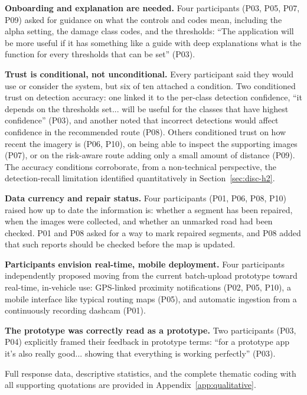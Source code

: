 \documentclass[10pt,a4paper,twocolumn]{article}
\begin{document}
\textbf{Onboarding and explanation are needed.} Four participants (P03,
P05, P07, P09) asked for guidance on what the controls and codes mean,
including the alpha setting, the damage class codes, and the thresholds:
``The application will be more useful if it has something like a guide
with deep explanations what is the function for every thresholds that can
be set'' (P03).

\textbf{Trust is conditional, not unconditional.} Every participant said
they would use or consider the system, but six of ten attached a
condition. Two conditioned trust on detection accuracy: one linked it to
the per-class detection confidence, ``it depends on the thresholds set...
will be useful for the classes that have highest confidence'' (P03), and
another noted that incorrect detections would affect confidence in the
recommended route (P08). Others conditioned trust on how recent the
imagery is (P06, P10), on being able to inspect the supporting images
(P07), or on the risk-aware route adding only a small amount of distance
(P09). The accuracy conditions corroborate, from a non-technical
perspective, the detection-recall limitation identified quantitatively in
Section~\ref{sec:disc-h2}.

\textbf{Data currency and repair status.} Four participants (P01, P06,
P08, P10) raised how up to date the information is: whether a segment has
been repaired, when the images were collected, and whether an unmarked
road had been checked. P01 and P08 asked for a way to mark repaired
segments, and P08 added that such reports should be checked before the map
is updated.

\textbf{Participants envision real-time, mobile deployment.} Four
participants independently proposed moving from the current batch-upload
prototype toward real-time, in-vehicle use: GPS-linked proximity
notifications (P02, P05, P10), a mobile interface like typical routing
maps (P05), and automatic ingestion from a continuously recording dashcam
(P01).

\textbf{The prototype was correctly read as a prototype.} Two participants
(P03, P04) explicitly framed their feedback in prototype terms: ``for a
prototype app it's also really good... showing that everything is working
perfectly'' (P03).

Full response data, descriptive statistics, and the complete thematic
coding with all supporting quotations are provided in
Appendix~\ref{app:qualitative}.


\end{document}
